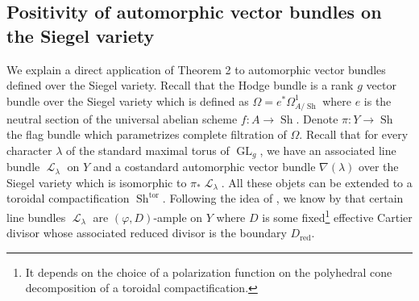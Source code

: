 \documentclass[11pt]{amsart}
\numberwithin{subsection}{section}
\numberwithin{figure}{section}
\numberwithin{table}{section}
\theoremstyle{1}
\theoremstyle{2}
\DeclareMathOperator{\GL}{GL}
\DeclareMathOperator{\Sh}{Sh}
\DeclareMathOperator{\tor}{tor}
\DeclareMathOperator{\Lc}{\mathcal{L}}
\DeclareMathOperator{\red}{red}
\begin{document}
\subsection{Positivity of automorphic vector bundles on the Siegel variety}
We explain a direct application of Theorem 2 to automorphic vector bundles defined over the Siegel variety. Recall that the Hodge bundle is a rank $g$ vector bundle over the Siegel variety which is defined as $\Omega = e^*\Omega^1_{A/\Sh}$ where $e$ is the neutral section of the universal abelian scheme $f : A \rightarrow \Sh$. Denote $\pi : Y \rightarrow \Sh$ the flag bundle which parametrizes complete filtration of $\Omega$. Recall that for every character $\lambda$ of the standard maximal torus of $\GL_g$, we have an associated line bundle $\Lc_{\lambda}$ on $Y$ and a costandard automorphic vector bundle $\nabla(\lambda)$ over the Siegel variety which is isomorphic to $\pi_{*}\Lc_{\lambda}$. All these objets can be extended to a toroidal compactification $\Sh^{\tor}$. Following the idea of \cite{StrohPrep}, we know by {\cite[Theorem 5.11]{alexandre2022vanishing}} that certain line bundles $\Lc_{\lambda}$ are $(\varphi,D)$-ample on $Y$ where $D$ is some fixed\footnote{It depends on the choice of a polarization function on the polyhedral cone decomposition of a toroidal compactification.} effective Cartier divisor whose associated reduced divisor is the boundary $D_{\red}$. \\
\end{document}
